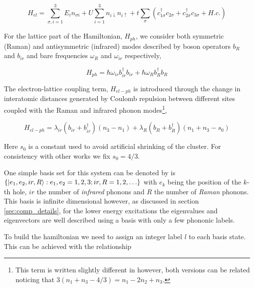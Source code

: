 \begin{equation}\label{eq:electronic-part}
H_{el} = \sum_{\sigma,i=1}^3 E_i n_{\sigma i} + U\sum_{i=1}^3 n_{i\downarrow}n_{i\uparrow} + t\sum_{\sigma}(c_{1\sigma}^\dagger c_{2\sigma} + c_{2\sigma}^\dagger c_{3\sigma} + H.c.)
\end{equation}

For the lattice  part of the Hamiltonian, $H_{ph}$, we consider both symmetric (Raman) and antisymmetric (infrared) modes described by boson operators $b_R$ and $b_{ir}$ and bare frequencies $\omega_R$ and $\omega_{ir}$ respectively,
 
\begin{equation}\label{eq:phonon-part}
H_{ph} = \hbar \omega_{ir}b_{ir}^\dagger b_{ir} + \hbar \omega_R b_R^\dagger b_R
\end{equation}

 
The electron-lattice coupling term, $H_{el-ph}$ is introduced through the change in interatomic distances generated by Coulomb repulsion between different sites coupled with the Raman and infrared phonon modes\footnote{This term is written slightly different in \cite{MustredeLeon1992} however, both versions can be related noticing that $3 (n_1+n_3-4/3)=n_1-2n_2+n_3$.},
 
\begin{equation}\label{eq:coupling-part}
H_{el-ph} = \lambda_{ir}(b_{ir} + b_{ir}^\dagger)(n_3 - n_1) + \lambda_R (b_R + b_R^\dagger)(n_1 + n_3-s_0)
\end{equation}

Here $s_0$ is a constant used to avoid artificial shrinking of the cluster. 
For consistency with other works \cite{MustredeLeon1992,DeLeon1999,Leon2008,MirandaMena2007} we fix $s_0=4/3$.


One simple basis set for this system can be denoted by is $\{\left | e_1,e_2,ir,R \right\rangle: e_1,e_2=1,2,3; ir,R=1,2,\ldots\}$ with $e_k$ being the position of the $k$-th hole, $ir$ the number of \textit{infrared} phonons and $R$ the number of \textit{Raman} phonons. 
This basis is infinite dimensional however, as discussed in section \ref{sec:comp_details}, for the lower energy excitations the eigenvalues and eigenvectors are well described using a basis with only a few phononic labels.

To build the hamiltonian we need to assign an integer label $l$ to each basis state. 
This can be achieved with the relationship

